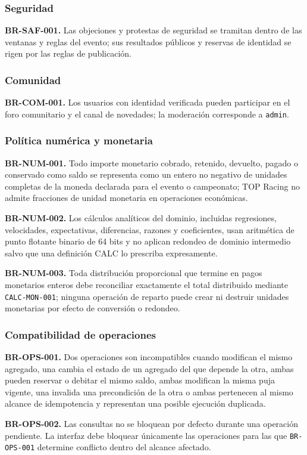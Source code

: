 \documentclass[10pt,letterpaper]{article}
\begin{document}
\subsubsection{Seguridad}
\noindent\textbf{BR-SAF-001.} Las objeciones y protestas de seguridad se tramitan dentro de las ventanas y reglas del evento; sus resultados públicos y reservas de identidad se rigen por las reglas de publicación.\par
\subsubsection{Comunidad}
\noindent\textbf{BR-COM-001.} Los usuarios con identidad verificada pueden participar en el foro comunitario y el canal de novedades; la moderación corresponde a \texttt{admin}.\par
\subsubsection{Política numérica y monetaria}
\noindent\textbf{BR-NUM-001.} Todo importe monetario cobrado, retenido, devuelto, pagado o conservado como saldo se representa como un entero no negativo de unidades completas de la moneda declarada para el evento o campeonato; TOP Racing no admite fracciones de unidad monetaria en operaciones económicas.\par
\noindent\textbf{BR-NUM-002.} Los cálculos analíticos del dominio, incluidas regresiones, velocidades, expectativas, diferencias, razones y coeficientes, usan aritmética de punto flotante binario de 64 bits y no aplican redondeo de dominio intermedio salvo que una definición CALC lo prescriba expresamente.\par
\noindent\textbf{BR-NUM-003.} Toda distribución proporcional que termine en pagos monetarios enteros debe reconciliar exactamente el total distribuido mediante \texttt{CALC-MON-001}; ninguna operación de reparto puede crear ni destruir unidades monetarias por efecto de conversión o redondeo.\par
\subsubsection{Compatibilidad de operaciones}
\noindent\textbf{BR-OPS-001.} Dos operaciones son incompatibles cuando modifican el mismo agregado, una cambia el estado de un agregado del que depende la otra, ambas pueden reservar o debitar el mismo saldo, ambas modifican la misma puja vigente, una invalida una precondición de la otra o ambas pertenecen al mismo alcance de idempotencia y representan una posible ejecución duplicada.\par
\noindent\textbf{BR-OPS-002.} Las consultas no se bloquean por defecto durante una operación pendiente. La interfaz debe bloquear únicamente las operaciones para las que \texttt{BR-OPS-001} determine conflicto dentro del alcance afectado.\par
\end{document}
